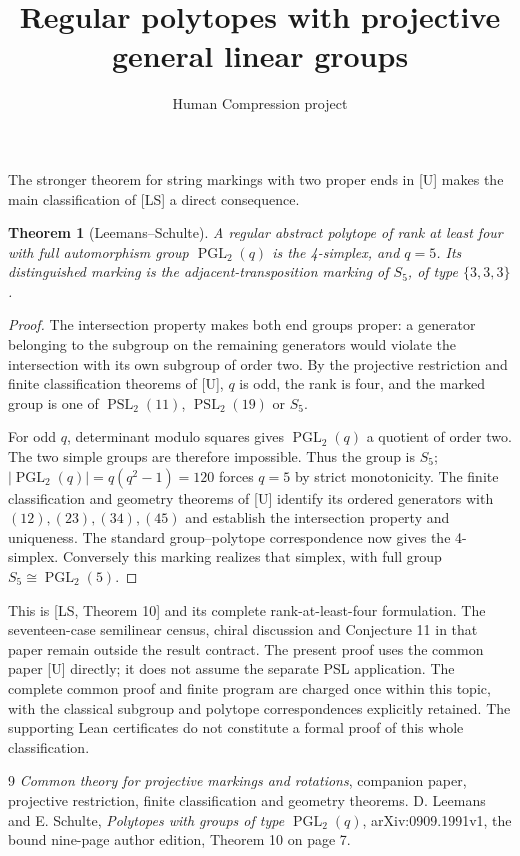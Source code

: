 \documentclass[11pt,a4paper]{article}
\title{Regular polytopes with projective general linear groups}
\author{Human Compression project}
\date{}
\newtheorem{theorem}{Theorem}
\begin{document}
\maketitle

The stronger theorem for string markings with two proper ends in [U]
makes the main classification of [LS] a direct consequence.

\begin{theorem}[Leemans--Schulte]
A regular abstract polytope of rank at least four with full
automorphism group $\operatorname{PGL}_2(q)$ is the 4-simplex, and
$q=5$. Its distinguished marking is the adjacent-transposition
marking of $S_5$, of type $\{3,3,3\}$.
\end{theorem}

\begin{proof}
The intersection property makes both end groups proper: a generator
belonging to the subgroup on the remaining generators would violate
the intersection with its own subgroup of order two. By the
projective restriction and finite classification theorems of [U],
$q$ is odd, the rank is four, and the marked group is one of
$\operatorname{PSL}_2(11)$, $\operatorname{PSL}_2(19)$ or $S_5$.

For odd $q$, determinant modulo squares gives
$\operatorname{PGL}_2(q)$ a quotient of order two. The two simple
groups are therefore impossible. Thus the group is $S_5$;
$|\operatorname{PGL}_2(q)|=q(q^2-1)=120$ forces $q=5$ by strict
monotonicity. The finite classification and geometry theorems of [U]
identify its ordered generators with $(12),(23),(34),(45)$ and
establish the intersection property and uniqueness. The standard
group--polytope correspondence now gives the 4-simplex. Conversely
this marking realizes that simplex, with full group
$S_5\cong\operatorname{PGL}_2(5)$.
\end{proof}

This is [LS, Theorem 10] and its complete rank-at-least-four
formulation. The seventeen-case semilinear census, chiral discussion
and Conjecture 11 in that paper remain outside the result contract.
The present proof uses the common paper [U] directly; it does not
assume the separate PSL application. The complete common proof and
finite program are charged once within this topic, with the
classical subgroup and polytope correspondences explicitly retained.
The supporting Lean certificates do not constitute a formal proof of
this whole classification.

\begin{thebibliography}{9}
 \emph{Common theory for projective markings and rotations},
companion paper, projective restriction, finite classification and
geometry theorems.
 D. Leemans and E. Schulte,
\emph{Polytopes with groups of type $\operatorname{PGL}_2(q)$},
arXiv:0909.1991v1, the bound nine-page author edition,
Theorem 10 on page 7.
\end{thebibliography}
\end{document}
